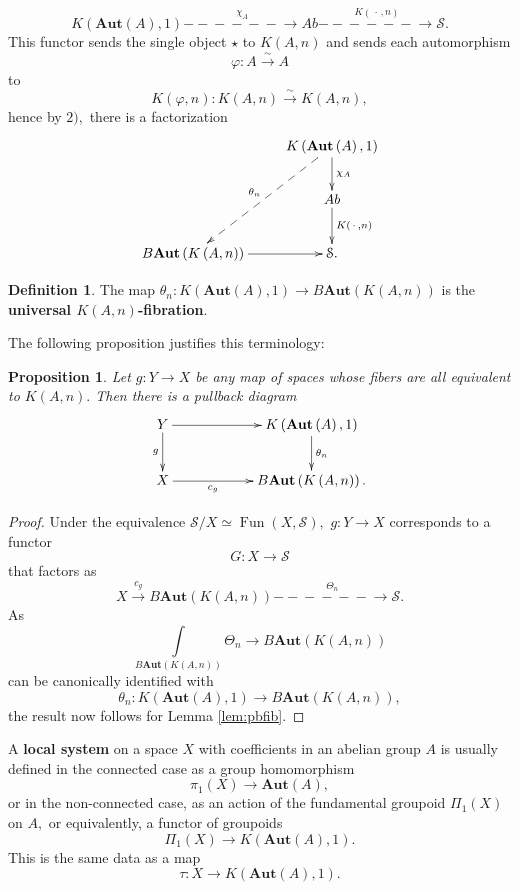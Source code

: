 \documentclass[12pt]{amsart}
\newtheorem{proposition}[dummy]{Proposition}
\theoremstyle{definition}
\newtheorem{definition}[dummy]{Definition}
\newcommand{\cS}{\mathcal{S}}
\def\Fun{\operatorname{Fun}}
\def\blank{\mspace{3mu}\cdot\mspace{3mu}}
\def\Aut{\mathbf{Aut}}
\def\longlongrightarrow{-\!\!\!-\!\!\!-\!\!\!-\!\!\!-\!\!\!-\!\!\!\longrightarrow}
\begin{document}
$$K\left(\Aut\left(A\right),1\right) \stackrel{\chi_A}{\longlongrightarrow} Ab \stackrel{ K\left(\blank,n\right)}{\longlongrightarrow} \cS.$$ This functor sends the single object $\star$ to $K\left(A,n\right)$ and sends each automorphism $$\varphi:A \stackrel{\sim}{\longrightarrow}A$$ to $$K\left(\varphi,n\right):K\left(A,n \right) \stackrel{\sim}{\longrightarrow} K\left(A,n \right),$$ hence by $2),$ there is a factorization
$$\xymatrix{& K\left(\Aut\left(A\right),1\right) \ar[d]^-{\chi_A} \ar@{-->}[ldd]_-{\theta_n}\\
& Ab \ar[d]^-{K\left(\blank,n\right)}\\
B\Aut\left(K\left(A,n\right)\right) \ar[r] & \cS.}$$

\begin{definition}
The map $\theta_n:K\left(\Aut\left(A\right),1\right) \to B\Aut\left(K\left(A,n\right)\right)$ is the \textbf{universal $K\left(A,n\right)$-fibration}.
\end{definition}

The following proposition justifies this terminology:

\begin{proposition}\label{prop: univ KAN fibration}
Let $g:Y \to X$ be any map of spaces whose fibers are all equivalent to $K\left(A,n\right).$ Then there is a pullback diagram
$$\xymatrix@C=2cm{Y \ar[d]_-{g} \ar[r] & K\left(\Aut\left(A\right),1\right) \ar[d]^-{\theta_n}\\
X \ar[r]_-{c_{g}} & B\Aut\left(K\left(A,n\right)\right).}$$
\end{proposition}

\begin{proof}
Under the equivalence $\cS/X \simeq \Fun\left(X,\cS\right),$ $g:Y \to X$ corresponds to a functor $$G:X \to \cS$$ that factors as
$$X \stackrel{c_g}{\longrightarrow} B\Aut\left(K\left(A,n\right)\right) \stackrel{\Theta_n}{\longlongrightarrow} \cS.$$
As $$\underset{B\Aut\left(K\left(A,n\right)\right)}\int \!\!\!\!\!\!\!\!\!\! \Theta_n \longrightarrow B\Aut\left(K\left(A,n\right)\right)$$ can be canonically identified with $$\theta_n:K\left(\Aut\left(A\right),1\right)  \to B\Aut\left(K\left(A,n\right)\right),$$ the result now follows for Lemma \ref{lem:pbfib}.
\end{proof}

A \textbf{local system} on a space $X$ with coefficients in an abelian group $A$ is usually defined in the connected case as a group homomorphism $$\pi_1\left(X\right) \to \Aut\left(A\right),$$ or in the non-connected case, as an action of the fundamental groupoid $\Pi_1\left(X\right)$ on $A,$ or equivalently, a functor of groupoids $$\Pi_1\left(X\right) \to K\left(\Aut\left(A\right),1\right).$$ This is the same data as a map $$\tau:X \to K\left(\Aut\left(A\right),1\right).$$
\end{document}

